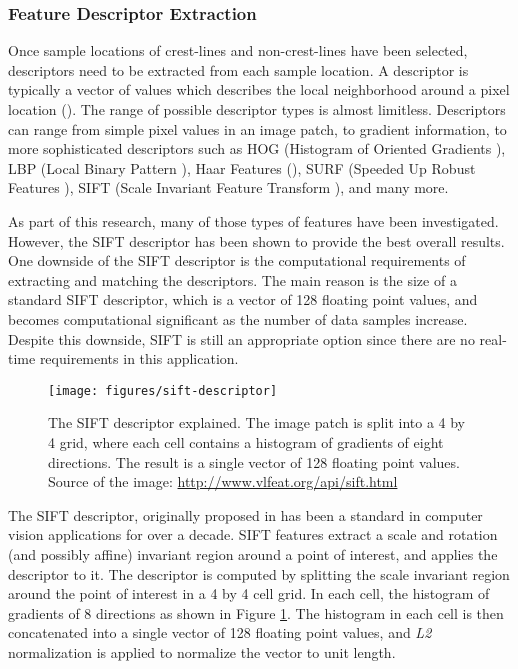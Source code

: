 \subsubsection{Feature Descriptor Extraction} \label{subsubsec:feature_descriptor_extraction}

Once sample locations of crest-lines and non-crest-lines have been selected, descriptors need to be extracted from each sample location. A descriptor is typically a vector of values which describes the local neighborhood around a pixel location (\cite{lowe_sift_paper,1994_good_features_to_track,1998_feature_detection,2007_invariant_features_survey}). The range of possible descriptor types is almost limitless. Descriptors can range from simple pixel values in an image patch, to gradient information, to more sophisticated descriptors such as HOG (Histogram of Oriented Gradients \cite{2007_hog_human_detection}), LBP (Local Binary Pattern \cite{1994_lbp_paper,1996_lbp_paper}), Haar Features (\cite{2001_viola_jones_paper}), SURF (Speeded Up Robust Features \cite{2006_surf}), SIFT (Scale Invariant Feature Transform \cite{lowe_sift_paper}), and many more.

As part of this research, many of those types of features have been investigated. However, the SIFT descriptor has been shown to provide the best overall results. One downside of the SIFT descriptor is the computational requirements of extracting and matching the descriptors. The main reason is the size of a standard SIFT descriptor, which is a vector of 128 floating point values, and becomes computational significant as the number of data samples increase. Despite this downside, SIFT is still an appropriate option since there are no real-time requirements in this application.

\begin{figure}
	\centering
	\texttt{[image: figures/sift-descriptor]}
	\caption{The SIFT descriptor explained. The image patch is split into a 4 by 4 grid, where each cell contains a histogram of gradients of eight directions. The result is a single vector of 128 floating point values. Source of the image: \underline{http://www.vlfeat.org/api/sift.html}}
	\label{fig:sift_descriptor}
\end{figure}

The SIFT descriptor, originally proposed in \cite{lowe_sift_paper} has been a standard in computer vision applications for over a decade. SIFT features extract a scale and rotation (and possibly affine) invariant region around a point of interest, and applies the descriptor to it. The descriptor is computed by splitting the scale invariant region around the point of interest in a 4 by 4 cell grid. In each cell, the histogram of gradients of 8 directions as shown in Figure \ref{fig:sift_descriptor}. The histogram in each cell is then concatenated into a single vector of 128 floating point values, and \emph{L2} normalization is applied to normalize the vector to unit length.   

